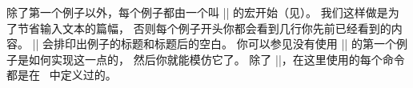 除了第一个例子以外，每个例子都由一个叫 |\xmpheader| 的宏开始（见）。
我们这样做是为了节省输入文本的篇幅，
否则每个例子开头你都会看到几行你先前已经看到的内容。
|\xmpheader| 会排印出例子的标题和标题后的空白。
你可以参见没有使用 |\xmpheader| 的第一个例子是如何实现这一点的，
然后你就能模仿它了。
除了 |\xmpheader|，在这里使用的每个命令都是在 \PlainTeX\ 中定义过的。

{%
   \let\bye = \relax %
}%

\ifcompletebook\else
\vfil{}
\fi

\endchapter
\byebye
